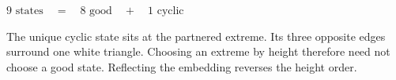 \documentclass[10pt,border=3pt]{standalone}
\begin{document}
\begin{minipage}{14.5cm}\centering\large $9\text{ states}\quad=\quad8\text{ good}\quad+\quad1\text{ cyclic}$\par\smallskip\normalsize The unique cyclic state sits at the partnered extreme. Its three opposite edges surround one white triangle. Choosing an extreme by height therefore need not choose a good state. Reflecting the embedding reverses the height order.\end{minipage}
\end{document}
